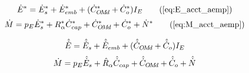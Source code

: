 

\begin{landscape}

\linespread{1}


\sectionsep{}

{
\begin{equation}
  \Eacctbsub{} \tag{\ref{eq:E_acct_aemp}}
\end{equation}
}
{
\begin{equation}
  \Macctbsub{} \tag{\ref{eq:M_acct_aemp}}
\end{equation}
}

\sectionsep{}


{
\begin{equation} \label{eq:E_acct_asub}
  \hat{\dot{E}} = \hat{\dot{E}}_s + \hat{\dot{E}}_{emb} + (\hat{\dot{C}}_{O\!M\!d} + \hat{\dot{C}}_o) I_E{}
\end{equation}
}
{
\begin{equation} \label{eq:M_acct_asub}
  \dot{M} = p_E \hat{\dot{E}}_s + \hat{R}_\alpha \hat{\dot{C}}_{cap} + \hat{\dot{C}}_{O\!M\!d} + \hat{\dot{C}}_o + \hat{\dot{N}}{}
\end{equation}
}

\sectionsep{}

\derivsection{}
{
~
  
}
\end{landscape}
